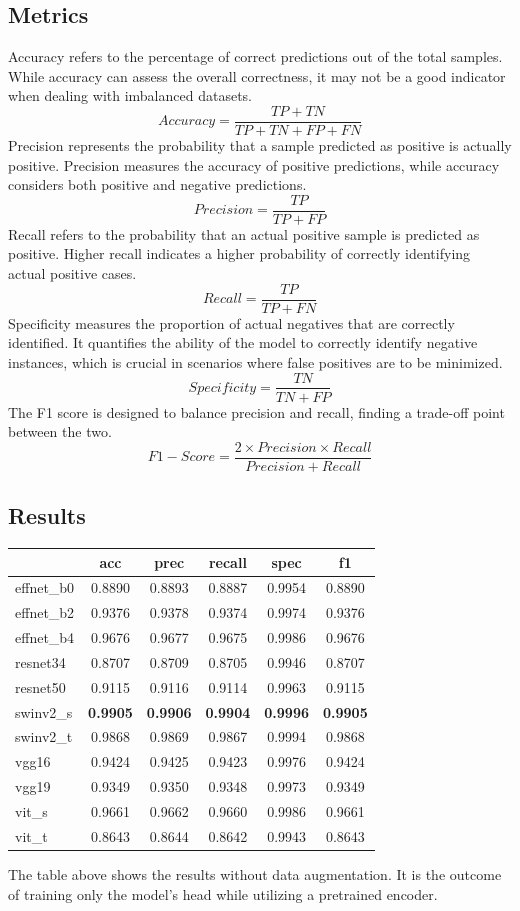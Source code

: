 \documentclass[10pt,twocolumn,letterpaper]{article}
\begin{document}
\subsection{Metrics}
\label{exper:metr}
Accuracy refers to the percentage of correct predictions out of the total samples. While accuracy can assess the overall correctness, it may not be a good indicator when dealing with imbalanced datasets.
\[Accuracy = \frac{TP+TN}{TP+TN+FP+FN}\]
\indent Precision represents the probability that a sample predicted as positive is actually positive. Precision measures the accuracy of positive predictions, while accuracy considers both positive and negative predictions.
\[Precision = \frac{TP}{TP+FP}\]
\indent Recall refers to the probability that an actual positive sample is predicted as positive. Higher recall indicates a higher probability of correctly identifying actual positive cases.
\[Recall = \frac{TP}{TP+FN}\]
\indent Specificity measures the proportion of actual negatives that are correctly identified. It quantifies the ability of the model to correctly identify negative instances, which is crucial in scenarios where false positives are to be minimized.
\[Specificity = \frac{TN}{TN+FP}\]
\indent The F1 score is designed to balance precision and recall, finding a trade-off point between the two.
\[F1-Score = \frac{2\times Precision\times Recall}{Precision+Recall}\]

\subsection{Results}
\label{exper:res}
\begin{tabularx}{\columnwidth}{lccccc}
	\toprule
	 & acc & prec & recall & spec & f1 \\
	\midrule
	effnet\_b0 & 0.8890 & 0.8893 & 0.8887 & 0.9954 & 0.8890 \\
	effnet\_b2 & 0.9376 & 0.9378 & 0.9374 & 0.9974 & 0.9376 \\
	effnet\_b4 & 0.9676 & 0.9677 & 0.9675 & 0.9986 & 0.9676 \\
	resnet34 & 0.8707 & 0.8709 & 0.8705 & 0.9946 & 0.8707 \\
	resnet50 & 0.9115 & 0.9116 & 0.9114 & 0.9963 & 0.9115 \\
	swinv2\_s & \textbf{0.9905} & \textbf{0.9906} & \textbf{0.9904} & \textbf{0.9996} & \textbf{0.9905} \\
	swinv2\_t & 0.9868 & 0.9869 & 0.9867 & 0.9994 & 0.9868 \\
	vgg16 & 0.9424 & 0.9425 & 0.9423 & 0.9976 & 0.9424 \\
	vgg19 & 0.9349 & 0.9350 & 0.9348 & 0.9973 & 0.9349 \\
	vit\_s & 0.9661 & 0.9662 & 0.9660 & 0.9986 & 0.9661 \\
	vit\_t& 0.8643 & 0.8644 & 0.8642 & 0.9943 & 0.8643 \\
	\bottomrule
	\end{tabularx}	
The table above shows the results without data augmentation. It is the outcome of training only the model's head while utilizing a pretrained encoder.
\end{document}

